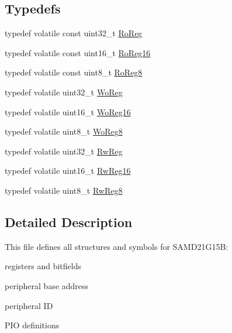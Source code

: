 \subsection*{Typedefs}
\begin{DoxyCompactItemize}
\item 
typedef volatile const uint32\+\_\+t \mbox{\hyperlink{group___s_a_m_d21_g15_b__definitions_ga5d556f8391af4141be23f7334ac9dd68}{Ro\+Reg}}
\item 
typedef volatile const uint16\+\_\+t \mbox{\hyperlink{group___s_a_m_d21_g15_b__definitions_gaebf6e33c2d49a802e06e22a95ea9d0d0}{Ro\+Reg16}}
\item 
typedef volatile const uint8\+\_\+t \mbox{\hyperlink{group___s_a_m_d21_g15_b__definitions_ga0d957f1433aaf5d70e4dc2b68288442d}{Ro\+Reg8}}
\item 
typedef volatile uint32\+\_\+t \mbox{\hyperlink{group___s_a_m_d21_g15_b__definitions_gac0f96d4e8018367b38f527007cf0eafd}{Wo\+Reg}}
\item 
typedef volatile uint16\+\_\+t \mbox{\hyperlink{group___s_a_m_d21_g15_b__definitions_ga0ab0e5f6c8301aa1c2068e511d854094}{Wo\+Reg16}}
\item 
typedef volatile uint8\+\_\+t \mbox{\hyperlink{group___s_a_m_d21_g15_b__definitions_ga5e336e5a36ee12ebeafb021108e5275b}{Wo\+Reg8}}
\item 
typedef volatile uint32\+\_\+t \mbox{\hyperlink{group___s_a_m_d21_g15_b__definitions_gacf1496e3bbe303e55f627fc7558a68c7}{Rw\+Reg}}
\item 
typedef volatile uint16\+\_\+t \mbox{\hyperlink{group___s_a_m_d21_g15_b__definitions_gacce07556c80fc352ae607f225f19fed5}{Rw\+Reg16}}
\item 
typedef volatile uint8\+\_\+t \mbox{\hyperlink{group___s_a_m_d21_g15_b__definitions_gae361754be775bb192f85821d3ab33c17}{Rw\+Reg8}}
\end{DoxyCompactItemize}


\subsection{Detailed Description}
This file defines all structures and symbols for S\+A\+M\+D21\+G15B\+:
\begin{DoxyItemize}
\item registers and bitfields
\item peripheral base address
\item peripheral ID
\item P\+IO definitions 
\end{DoxyItemize}

